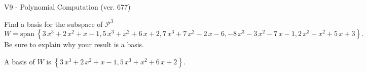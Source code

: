 \begin{exercise}
  \begin{exerciseTitle}V9 - Polynomial Computation (ver. 677)\end{exerciseTitle}
  \begin{exerciseStatement}
    Find a basis for the subspace of \(\mathcal{P}^3\) 
\[W=\mathrm{span}\ \left\{3 \, x^{3} + 2 \, x^{2} + x - 1 , 5 \, x^{3} + x^{2} + 6 \, x + 2 , 7 \, x^{3} + 7 \, x^{2} - 2 \, x - 6 , -8 \, x^{3} - 3 \, x^{2} - 7 \, x - 1 , 2 \, x^{3} - x^{2} + 5 \, x + 3\right\}.\]
 Be sure to explain why your result is a basis.


  \end{exerciseStatement}
  \begin{exerciseAnswer}
   A basis of \(W\) is  \(\left\{3 \, x^{3} + 2 \, x^{2} + x - 1 , 5 \, x^{3} + x^{2} + 6 \, x + 2\right\}\).
  


  \end{exerciseAnswer}
\end{exercise}